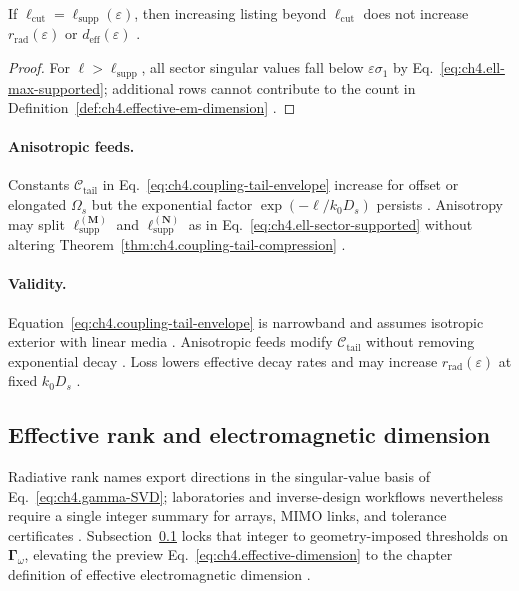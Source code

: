 \begin{theorem}
\label{thm:ch4.tail-cutoff-optimal}
If \(\ell_{\mathrm{cut}}=\ell_{\mathrm{supp}}(\varepsilon)\), then increasing listing beyond \(\ell_{\mathrm{cut}}\) does not increase
\(r_{\mathrm{rad}}(\varepsilon)\) or \(d_{\mathrm{eff}}(\varepsilon)\) \cite{hansen1988,harrington2001,devaney2004,stratton1941}.
\end{theorem}
\begin{proof}
For \(\ell>\ell_{\mathrm{supp}}\), all sector singular values fall below \(\varepsilon\sigma_{1}\) by
Eq.~\eqref{eq:ch4.ell-max-supported}; additional rows cannot contribute to the count in
Definition~\ref{def:ch4.effective-em-dimension} \cite{harrington2001,hansen1988}.
\end{proof}

\paragraph{Anisotropic feeds.}
Constants \(\mathcal{C}_{\mathrm{tail}}\) in Eq.~\eqref{eq:ch4.coupling-tail-envelope} increase for offset or elongated \(\Omega_{s}\)
but the exponential factor \(\exp(-\ell/k_{0}D_{s})\) persists \cite{harrington2001,collin2001,devaney2004}. Anisotropy may split
\(\ell_{\mathrm{supp}}^{(\mathbf{M})}\) and \(\ell_{\mathrm{supp}}^{(\mathbf{N})}\) as in Eq.~\eqref{eq:ch4.ell-sector-supported} without
altering Theorem~\ref{thm:ch4.coupling-tail-compression} \cite{hansen1988,stratton1941,jackson1999}.

\paragraph{Validity.}
Equation~\eqref{eq:ch4.coupling-tail-envelope} is narrowband and assumes isotropic exterior with linear media \cite{stratton1941,hansen1988}.
Anisotropic feeds modify \(\mathcal{C}_{\mathrm{tail}}\) without removing exponential decay \cite{harrington2001,devaney2004,collin2001}.
Loss lowers effective decay rates and may increase \(r_{\mathrm{rad}}(\varepsilon)\) at fixed \(k_{0}D_{s}\) \cite{stratton1941,jackson1999}.


\subsection{Effective rank and electromagnetic dimension}
\label{sec:ch464}

Radiative rank names export directions in the singular-value basis of Eq.~\eqref{eq:ch4.gamma-SVD}; laboratories and inverse-design workflows
nevertheless require a single integer summary for arrays, MIMO links, and tolerance certificates \cite{harrington2001,devaney2004,collin2001}.
Subsection~\ref{sec:ch464} locks that integer to geometry-imposed thresholds on \(\boldsymbol{\Gamma}_\omega\), elevating the preview
Eq.~\eqref{eq:ch4.effective-dimension} to the chapter definition of effective electromagnetic dimension
\cite{stratton1941,hansen1988,jackson1999}.

